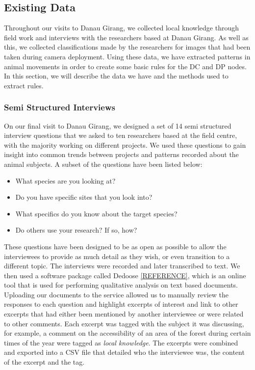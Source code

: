 		\subsection{Existing Data}
			Throughout our visits to Danau Girang, we collected local knowledge through field work and interviews with the researchers based at Danau Girang. As well as this, we collected classifications made by the researchers for images that had been taken during camera deployment. Using these data, we have extracted patterns in animal movements in order to create some basic rules for the DC and DP nodes. In this section, we will describe the data we have and the methods used to extract rules.
			
			\subsubsection{Semi Structured Interviews}
			On our final visit to Danau Girang, we designed a set of 14 semi structured interview questions that we asked to ten researchers based at the field centre, with the majority working on different projects. We used these questions to gain insight into common trends between projects and patterns recorded about the animal subjects. A subset of the questions have been listed below:
			
			\begin{itemize}
				\item What species are you looking at?
				\item Do you have specific sites that you look into?
				\item What specifics do you know about the target species?
				\item Do others use your research? If so, how?
			\end{itemize}
			
			These questions have been designed to be as open as possible to allow the interviewees to provide as much detail as they wish, or even transition to a different topic. The interviews were recorded and later transcribed to text. We then used a software package called Dedoose \ref{REFERENCE}, which is an online tool that is used for performing qualitative analysis on text based documents. Uploading our documents to the service allowed us to manually review the responses to each question and highlight excerpts of interest and link to other excerpts that had either been mentioned by another interviewee or were related to other comments. Each excerpt was tagged with the subject it was discussing, for example, a comment on the accessibility of an area of the forest during certain times of the year were tagged as \textit{local knowledge}. The excerpts were combined and exported into a CSV file that detailed who the interviewee was, the content of the excerpt and the tag.
			
